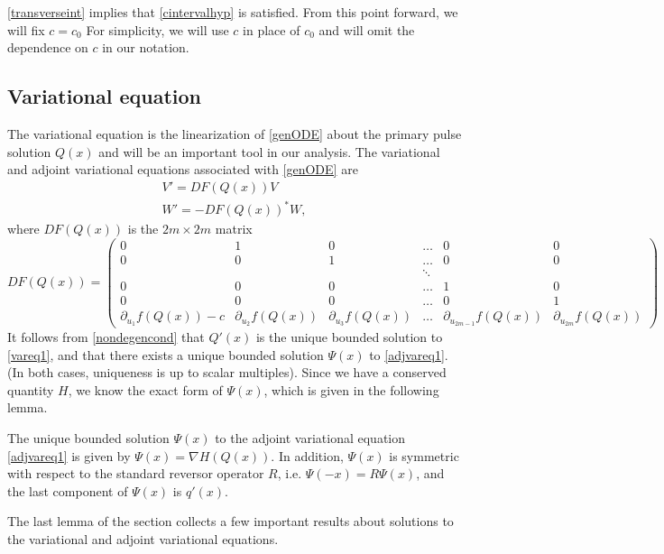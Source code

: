 \documentclass[thesis.tex]{subfiles}
\begin{document}
\noi \cref{transverseint} implies that \cref{cintervalhyp} is satisfied. From this point forward, we will fix $c = c_0$ For simplicity, we will use $c$ in place of $c_0$ and will omit the dependence on $c$ in our notation.

\subsection{Variational equation}\label{sec:vareq1}

The variational equation is the linearization of \cref{genODE} about the primary pulse solution $Q(x)$ and will be an important tool in our analysis. The variational and adjoint variational equations associated with \cref{genODE} are
\begin{align}
V' = DF(Q(x)) V \label{vareq1} \\
W' = -DF(Q(x))^* W \label{adjvareq1},
\end{align}
where $DF(Q(x))$ is the $2m \times 2m$ matrix
\begin{equation}\label{defDF}
DF(Q(x)) = 
\begin{pmatrix}
0 & 1 & 0 & \dots & 0 & 0 \\
0 & 0 & 1 & \dots & 0 & 0 \\
& && \ddots \\
0 & 0 & 0 & \dots & 1 & 0 \\
0 & 0 & 0 & \dots & 0 & 1 \\
\partial_{u_1}f(Q(x)) - c & \partial_{u_2}f(Q(x)) & \partial_{u_3}f(Q(x)) & \dots & \partial_{u_{2m-1}}f(Q(x)) & \partial_{u_{2m}}f(Q(x))
\end{pmatrix}
\end{equation}
It follows from \cref{nondegencond} that $Q'(x)$ is the unique bounded solution to \cref{vareq1}, and that there exists a unique bounded solution $\Psi(x)$ to \cref{adjvareq1}. (In both cases, uniqueness is up to scalar multiples). Since we have a conserved quantity $H$, we know the exact form of $\Psi(x)$, which is given in the following lemma.

\begin{lemma}\label{psiform}
The unique bounded solution $\Psi(x)$ to the adjoint variational equation \cref{adjvareq1} is given by $\Psi(x) = \nabla H(Q(x))$. In addition, $\Psi(x)$ is symmetric with respect to the standard reversor operator $R$, i.e. $\Psi(-x) = R \Psi(x)$, and
the last component of $\Psi(x)$ is $q'(x)$.
\end{lemma}

The last lemma of the section collects a few important results about solutions to the variational and adjoint variational equations.
\end{document}
